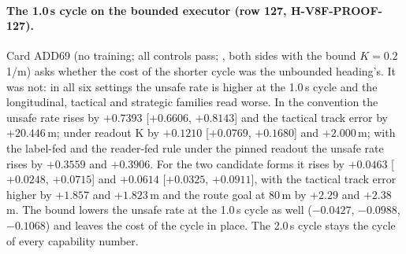 \paragraph{The 1.0\,s cycle on the bounded executor (row 127, H-V8F-PROOF-127).} Card ADD69 (no training; all controls pass; , both sides with the bound $K=0.2$\,1/m) asks whether the cost of the shorter cycle was the unbounded heading's. It was not: in all six settings the unsafe rate is higher at the 1.0\,s cycle and the longitudinal, tactical and strategic families read worse. In the convention the unsafe rate rises by $+0.7393$ [$+0.6606$, $+0.8143$] and the tactical track error by $+20.446$\,m; under readout K by $+0.1210$ [$+0.0769$, $+0.1680$] and $+2.000$\,m; with the label-fed and the reader-fed rule under the pinned readout the unsafe rate rises by $+0.3559$ and $+0.3906$. For the two candidate forms it rises by $+0.0463$ [$+0.0248$, $+0.0715$] and $+0.0614$ [$+0.0325$, $+0.0911$], with the tactical track error higher by $+1.857$ and $+1.823$\,m and the route goal at 80\,m by $+2.29$ and $+2.38$\,m. The bound lowers the unsafe rate at the 1.0\,s cycle as well ($-0.0427$, $-0.0988$, $-0.1068$) and leaves the cost of the cycle in place. The 2.0\,s cycle stays the cycle of every capability number.

